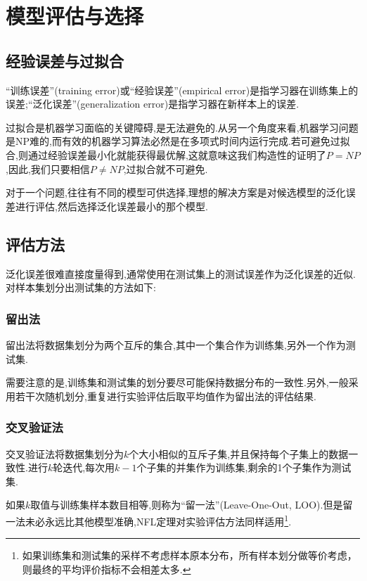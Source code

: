 \chapter{模型评估与选择}

\section{经验误差与过拟合}

``训练误差''(training error)或``经验误差''(empirical error)是指学习器在训练集上的误差;``泛化误差''(generalization error)是指学习器在新样本上的误差.

过拟合是机器学习面临的关键障碍,是无法避免的.从另一个角度来看,机器学习问题是NP难的,而有效的机器学习算法必然是在多项式时间内运行完成.若可避免过拟合,则通过经验误差最小化就能获得最优解,这就意味这我们构造性的证明了$P=NP$,因此,我们只要相信$P\ne NP$,过拟合就不可避免.

对于一个问题,往往有不同的模型可供选择,理想的解决方案是对候选模型的泛化误差进行评估,然后选择泛化误差最小的那个模型.

\section{评估方法}

泛化误差很难直接度量得到,通常使用在测试集上的测试误差作为泛化误差的近似.对样本集划分出测试集的方法如下:

\subsection{留出法}

留出法将数据集划分为两个互斥的集合,其中一个集合作为训练集,另外一个作为测试集.

需要注意的是,训练集和测试集的划分要尽可能保持数据分布的一致性.另外,一般采用若干次随机划分,重复进行实验评估后取平均值作为留出法的评估结果.

\subsection{交叉验证法}

交叉验证法将数据集划分为$k$个大小相似的互斥子集,并且保持每个子集上的数据一致性.进行$k$轮迭代,每次用$k-1$个子集的并集作为训练集,剩余的1个子集作为测试集.

如果$k$取值与训练集样本数目相等,则称为``留一法''(Leave-One-Out, LOO).但是留一法未必永远比其他模型准确,NFL定理对实验评估方法同样适用\footnote{如果训练集和测试集的采样不考虑样本原本分布，所有样本划分做等价考虑，则最终的平均评价指标不会相差太多.}.

